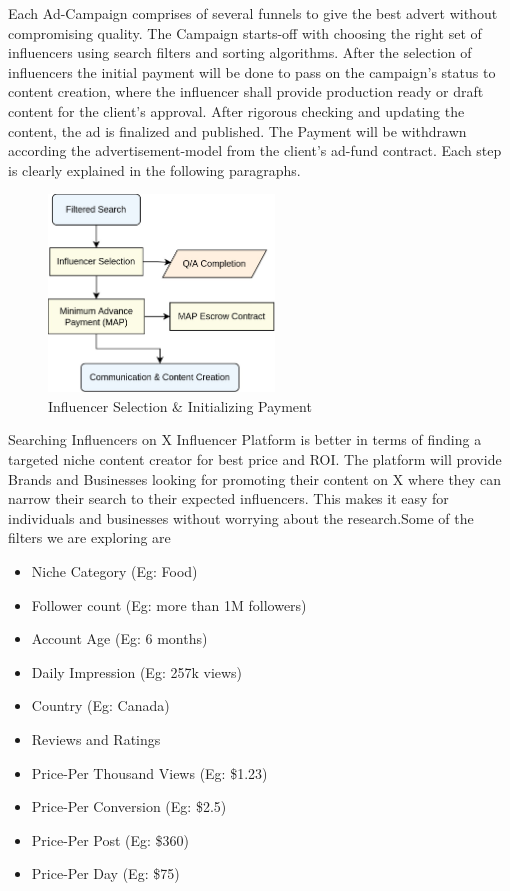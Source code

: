 \documentclass[letterpaper,11pt]{article}
\begin{document}
Each Ad-Campaign comprises of several funnels to give the best advert without compromising quality. The Campaign starts-off with choosing the right set of influencers using search filters and sorting algorithms. After the selection of influencers the initial payment will be done to pass on the campaign's status to content creation, where the influencer shall provide production ready or draft content for the client's approval. After rigorous checking and updating the content, the ad is finalized and published. The Payment will be withdrawn according the advertisement-model from the client's ad-fund contract. Each step is clearly explained in the following paragraphs.\\ 

\begin{figure}[H]
\begin{center}
\includegraphics[width=6cm]{ad-selection}
\caption{Influencer Selection \& Initializing Payment}
\end{center}
\end{figure}

Searching Influencers on X Influencer Platform is better in terms of finding a targeted niche content creator for best price and ROI. The platform will provide Brands and Businesses looking for promoting their content on X where they can narrow their search to their expected influencers. This makes it easy for individuals and businesses without worrying about the research.Some of the filters we are exploring are
\begin{itemize}[wide, labelwidth=!, labelindent=0pt]
\item Niche Category (Eg: Food)
\item Follower count (Eg: more than 1M followers)
\item Account Age (Eg: 6 months)
\item Daily Impression (Eg: 257k views)
\item Country (Eg: Canada)
\item Reviews and Ratings
\item Price-Per Thousand Views (Eg: \$1.23)
\item Price-Per Conversion (Eg: \$2.5)
\item Price-Per Post (Eg: \$360)
\item Price-Per Day (Eg: \$75)
\end{itemize}
\end{document}
